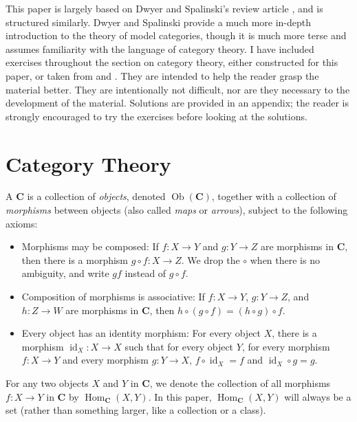 \documentclass{amsart}
\theoremstyle{definition} \newaliasedtheorem{defn}[thm]{Definition}
\theoremstyle{definition} \newtheorem*{defn*}{Definition}
\theoremstyle{definition} \newaliasedtheorem{xca}[thm]{Exercise}
\theoremstyle{definition} \newtheorem*{soln*}{Solution}
\theoremstyle{definition} \newaliasedtheorem{remark}[thm]{Remark}
\theoremstyle{definition} \newtheorem*{remark*}{Remark}
\newcommand{\defnlabel}[2][]{%
  \ifempty{#1}{%
    \label{defn:#2}\emph{#2}%
  }{%
    \label{defn:#1}\emph{#2}%
  }%
}
\newcommand{\cat}[1]{\ensuremath{\mathbf{#1}}}
\DeclareMathOperator{\Ob}{Ob}
\DeclareMathOperator{\id}{id}
\DeclareMathOperator{\Hom}{Hom}
\begin{document}
  This paper is largely based on Dwyer and Spalinski's review article \cite{dwyer1995homotopy}, and is structured similarly.  Dwyer and Spalinski provide a much more in-depth introduction to the theory of model categories, though it is much more terse and assumes familiarity with the language of category theory.  I have included exercises throughout the section on category theory, either constructed for this paper, or taken from \cite{commutative_algebra} and \cite{sets_maps_limits_colimits}.  They are intended to help the reader grasp the material better.  They are intentionally not difficult, nor are they necessary to the development of the material.  Solutions are provided in an appendix; the reader is strongly encouraged to try the exercises before looking at the solutions.

\section{Category Theory}
  \begin{defn}[Category]
    A \defnlabel{category} $\cat C$ is a collection of \emph{objects}, denoted $\Ob(\cat C)$, together with a collection of \emph{morphisms} between objects (also called \emph{maps} or \emph{arrows}), subject to the following axioms:
    \begin{itemize}
      \item Morphisms may be composed:  If $f: X \to Y$ and $g : Y \to Z$ are morphisms in \cat C, then there is a morphism $g \circ f : X \to Z$.  We drop the $\circ$ when there is no ambiguity, and write $gf$ instead of $g \circ f$.
      \item Composition of morphisms is associative:  If $f: X \to Y$, $g: Y\to Z$, and $h: Z\to W$ are morphisms in \cat C, then $h \circ (g \circ f) = (h \circ g) \circ f$.
      \item Every object has an identity morphism:  For every object $X$, there is a morphism $\id_X : X \to X$ such that for every object $Y$, for every morphism $f : X \to Y$ and every morphism $g : Y \to X$, $f \circ \id_X = f$ and $\id_X \circ g = g$.
    \end{itemize}
    
    For any two objects $X$ and $Y$ in $\cat C$, we denote the collection of all morphisms $f: X \to Y$ in $\cat C$ by $\Hom_{\cat C}(X, Y)$.  In this paper, $\Hom_{\cat C}(X, Y)$ will always be a set (rather than something larger, like a collection or a class).
  \end{defn}
  
\end{document}
